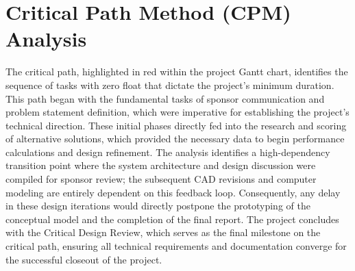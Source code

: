 \documentclass[12pt, letterpaper]{report}%
\newcounter{mycounter}           %
\newcounter{sub}[mycounter]      %
\begin{document}
\section{Critical Path Method (CPM) Analysis}
\label{subsec:cpm}


The critical path, highlighted in red within the project Gantt chart, identifies the sequence of tasks with zero float that dictate the 
project’s minimum duration. This path began with the fundamental tasks of sponsor communication and problem statement definition, which
 were imperative for establishing the project's technical direction. These initial phases directly fed into the research and scoring of 
 alternative solutions, which provided the necessary data to begin performance calculations and design refinement. The analysis identifies
  a high-dependency transition point where the system architecture and design discussion were compiled for sponsor review; the subsequent 
  CAD revisions and computer modeling are entirely dependent on this feedback loop. Consequently, any delay in these design iterations would
   directly postpone the prototyping of the conceptual model and the completion of the final report. The project concludes with the Critical
    Design Review, which serves as the final milestone on the critical path, ensuring all technical requirements and documentation converge
     for the successful closeout of the project.



%
%
%
\end{document}
